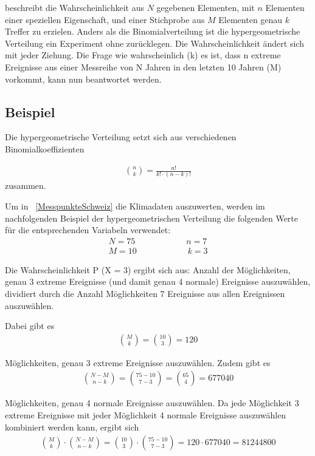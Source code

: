 \begin{refsection}
beschreibt die Wahrscheinlichkeit aus $N$ gegebenen Elementen, mit $n$ Elementen einer speziellen Eigenschaft, und einer Stichprobe aus $M$ Elementen genau $k$ Treffer zu erzielen. 
Anders als die Binomialverteilung ist die hypergeometrische Verteilung ein Experiment ohne zurücklegen. Die Wahrscheinlichkeit ändert sich mit jeder Ziehung. Die Frage wie wahrscheinlich (k) es ist, dass n extreme Ereignisse aus einer Messreihe von N Jahren in den letzten 10 Jahren (M) vorkommt, kann nun beantwortet werden.


\subsection{Beispiel} \label{Beispiel}
Die hypergeometrische Verteilung setzt sich aus verschiedenen Binomialkoeffizienten

\begin{align*}
\binom{n}{k} = \frac {n!}{k! \cdot (n-k)!} 
\end{align*}
zusammen.

Um in ~\ref{MesspunkteSchweiz}  die Klimadaten auszuwerten, werden im nachfolgenden Beispiel der hypergeometrischen Verteilung die folgenden Werte für die entsprechenden Variabeln verwendet:
\begin{align*}
N = 75 \quad \quad \quad \quad \quad \quad 
n = 7 \\
M = 10 \quad \quad \quad \quad \quad \quad 
k = 3
\end{align*}

Die Wahrscheinlichkeit P (X = 3) ergibt sich aus:
Anzahl der Möglichkeiten, genau 3 extreme Ereignisse (und damit genau 4 normale) Ereignisse auszuwählen, dividiert durch die Anzahl Möglichkeiten 7 Ereignisse aus allen Ereignissen auszuwählen.
 
Dabei gibt es
\begin{align*}
\binom{M}{k} = \binom{10}{3} = 120
\end{align*}

Möglichkeiten, genau 3 extreme Ereignisse auszuwählen.
Zudem gibt es 
\begin{align*}
\binom{N-M}{n-k} = \binom{75-10}{7-3} = \binom{65}{4} = 677040
\end{align*}

Möglichkeiten, genau 4 normale Ereignisse auszuwählen.
Da jede Möglichkeit 3 extreme Ereignisse mit jeder Möglichkeit 4 normale Ereignisse auszuwählen kombiniert werden kann, ergibt sich
\begin{align*}
\binom{M}{k} \cdot \binom{N-M}{n-k} = \binom{10}{3} \cdot \binom{75-10}{7-3} = 120 
\cdot 677040 = 81244800
\end{align*}


\end{refsection}
